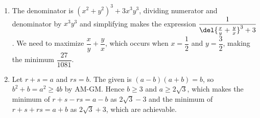 \documentclass[10pt,paper=letter]{scrartcl}
\begin{document}
\begin{enumerate}
\item The denominator is $(x^2 + y^2)^3 + 3x^3y^3$, dividing numerator and denominator by $x^3y^3$ and simplifying makes the expression $\dfrac{1}{\del{\frac{x}{y} + \frac{y}{x}}^3 + 3}$. We need to maximize $\dfrac{x}{y} + \dfrac{y}{x}$, which occurs when $x = \dfrac12$ and $y = \dfrac32$, making the minimum $\dfrac{27}{1081}$.

\item Let $r + s = a$ and $rs = b$. The given is $(a - b)(a + b) = b$, so $b^2 + b = a^2 \geq 4b$ by AM-GM. Hence $b \geq 3$ and $a \geq 2\sqrt3$, which makes the minimum of $r+s-rs = a-b$ as $2\sqrt3 - 3$ and the minimum of $r+s+rs = a+b$ as $2\sqrt3 + 3$, which are achievable.

\end{enumerate}
\end{document}
